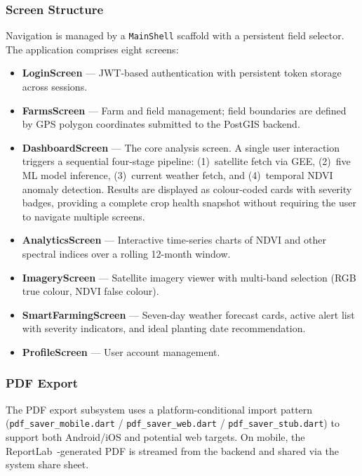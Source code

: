 \documentclass[conference]{IEEEtran}
\begin{document}
\subsubsection{Screen Structure}
Navigation is managed by a \texttt{MainShell} scaffold with a persistent
field selector. The application comprises eight screens:

\begin{itemize}
  \item \textbf{LoginScreen} --- JWT-based authentication with persistent
        token storage across sessions.
  \item \textbf{FarmsScreen} --- Farm and field management; field boundaries
        are defined by GPS polygon coordinates submitted to the PostGIS backend.
  \item \textbf{DashboardScreen} --- The core analysis screen. A single user
        interaction triggers a sequential four-stage pipeline: (1)~satellite
        fetch via GEE, (2)~five ML model inference, (3)~current weather fetch,
        and (4)~temporal NDVI anomaly detection. Results are displayed as
        colour-coded cards with severity badges, providing a complete crop
        health snapshot without requiring the user to navigate multiple screens.
  \item \textbf{AnalyticsScreen} --- Interactive time-series charts of NDVI
        and other spectral indices over a rolling 12-month window.
  \item \textbf{ImageryScreen} --- Satellite imagery viewer with multi-band
        selection (RGB true colour, NDVI false colour).
  \item \textbf{SmartFarmingScreen} --- Seven-day weather forecast cards,
        active alert list with severity indicators, and ideal planting date
        recommendation.
  \item \textbf{ProfileScreen} --- User account management.
\end{itemize}

\subsubsection{PDF Export}
The PDF export subsystem uses a platform-conditional import pattern
(\texttt{pdf\_saver\_mobile.dart} / \texttt{pdf\_saver\_web.dart} /
\texttt{pdf\_saver\_stub.dart}) to support both Android/iOS and potential
web targets. On mobile, the ReportLab~\cite{reportlab}-generated PDF is
streamed from the backend and shared via the system share sheet.
\end{document}
